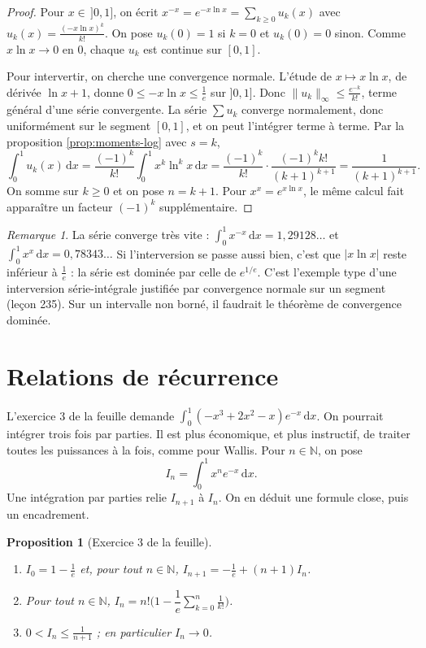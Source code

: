 \documentclass[11pt,a4paper]{article}
\theoremstyle{plain}
\newtheorem{proposition}[theoreme]{Proposition}
\theoremstyle{definition}
\theoremstyle{remark}
\newtheorem{remarque}[theoreme]{Remarque}
\newcommand{\N}{\mathbb{N}}
\newcommand{\dd}{\,\mathrm{d}}
\begin{document}
\begin{proof}
Pour $x\in\,]0,1]$, on écrit $x^{-x}=e^{-x\ln x}=\sum_{k\geq0}u_k(x)$ avec $u_k(x)=\frac{(-x\ln x)^k}{k!}$. On pose $u_k(0)=1$ si $k=0$ et $u_k(0)=0$ sinon. Comme $x\ln x\to0$ en $0$, chaque $u_k$ est continue sur $[0,1]$.

Pour intervertir, on cherche une convergence normale. L'étude de $x\mapsto x\ln x$, de dérivée $\ln x+1$, donne $0\leq-x\ln x\leq\frac1e$ sur $]0,1]$. Donc $\|u_k\|_\infty\leq\frac{e^{-k}}{k!}$, terme général d'une série convergente. La série $\sum u_k$ converge normalement, donc uniformément sur le segment $[0,1]$, et on peut l'intégrer terme à terme. Par la proposition \ref{prop:moments-log} avec $s=k$,
\[
  \int_0^1u_k(x)\dd x=\frac{(-1)^k}{k!}\int_0^1x^k\ln^kx\dd x=\frac{(-1)^k}{k!}\cdot\frac{(-1)^kk!}{(k+1)^{k+1}}=\frac{1}{(k+1)^{k+1}} .
\]
On somme sur $k\geq0$ et on pose $n=k+1$. Pour $x^x=e^{x\ln x}$, le même calcul fait apparaître un facteur $(-1)^k$ supplémentaire.
\end{proof}

\begin{remarque}
La série converge très vite : $\int_0^1x^{-x}\dd x=1{,}29128\ldots$ et $\int_0^1x^x\dd x=0{,}78343\ldots$ Si l'interversion se passe aussi bien, c'est que $|x\ln x|$ reste inférieur à $\frac1e$ : la série est dominée par celle de $e^{1/e}$. C'est l'exemple type d'une interversion série-intégrale justifiée par convergence normale sur un segment (leçon 235). Sur un intervalle non borné, il faudrait le théorème de convergence dominée.
\end{remarque}

\section{Relations de récurrence}

L'exercice 3 de la feuille demande $\int_0^1(-x^3+2x^2-x)e^{-x}\dd x$. On pourrait intégrer trois fois par parties. Il est plus économique, et plus instructif, de traiter toutes les puissances à la fois, comme pour Wallis. Pour $n\in\N$, on pose
\[
  I_n=\int_0^1x^ne^{-x}\dd x .
\]
Une intégration par parties relie $I_{n+1}$ à $I_n$. On en déduit une formule close, puis un encadrement.

\begin{proposition}[Exercice 3 de la feuille]\label{prop:rec}
\begin{enumerate}[nosep]
\item $I_0=1-\frac1e$ et, pour tout $n\in\N$, $I_{n+1}=-\frac1e+(n+1)I_n$.
\item Pour tout $n\in\N$, $I_n=n!\Big(1-\dfrac1e\displaystyle\sum_{k=0}^n\frac1{k!}\Big)$.
\item $0<I_n\leq\frac1{n+1}$ ; en particulier $I_n\to0$.
\end{enumerate}
\end{proposition}
\end{document}
